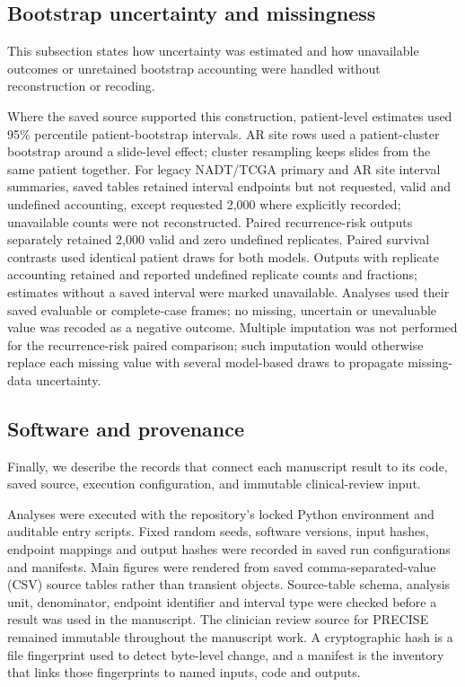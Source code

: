 \subsection{Bootstrap uncertainty and missingness}

This subsection states how uncertainty was estimated and how unavailable outcomes or
unretained bootstrap accounting were handled without reconstruction or recoding.

Where the saved source supported this construction, patient-level estimates used
95\% percentile patient-bootstrap intervals. AR site rows used a patient-cluster bootstrap
around a slide-level effect; cluster resampling keeps slides from the same patient together.
For legacy NADT/TCGA primary and AR site interval summaries,
saved tables retained interval endpoints but not requested, valid and undefined accounting,
except requested 2,000 where explicitly recorded; unavailable counts were not reconstructed.
Paired recurrence-risk outputs separately retained 2,000 valid and zero undefined replicates.
Paired survival contrasts used identical patient draws for both models. Outputs with
replicate accounting retained and reported undefined replicate counts and fractions;
estimates without a saved interval were marked unavailable. Analyses used their
saved evaluable or complete-case frames; no missing, uncertain or unevaluable value was
recoded as a negative outcome. Multiple imputation was not performed for the recurrence-risk paired
comparison; such imputation would otherwise replace each missing value with several
model-based draws to propagate missing-data uncertainty.

\subsection{Software and provenance}

Finally, we describe the records that connect each manuscript result to its code, saved
source, execution configuration, and immutable clinical-review input.

Analyses were executed with the repository's locked Python environment and auditable entry
scripts. Fixed random seeds, software versions, input hashes, endpoint mappings and output
hashes were recorded in saved run configurations and manifests. Main figures were rendered
from saved comma-separated-value (CSV) source tables rather than transient objects.
Source-table schema, analysis
unit, denominator, endpoint identifier and interval type were checked before a result was
used in the manuscript. The clinician review source for PRECISE remained immutable throughout
the manuscript work.
A cryptographic hash is a file fingerprint used to detect byte-level change, and a manifest
is the inventory that links those fingerprints to named inputs, code and outputs.

